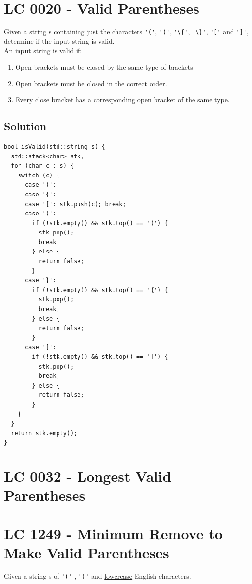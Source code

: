\section{LC 0020 - Valid Parentheses}
Given a string s containing just the characters {\colorbox{CodeBackground}{\lstinline|'('|}}, {\colorbox{CodeBackground}{\lstinline|')'|}}, {\colorbox{CodeBackground}{\lstinline|'\{'|}}, {\colorbox{CodeBackground}{\lstinline|'\}'|}}, {\colorbox{CodeBackground}{\lstinline|'['|}} and {\colorbox{CodeBackground}{\lstinline|']'|}}, determine if the input string is valid.\\

An input string is valid if:
\begin{enumerate}
	\item Open brackets must be closed by the same type of brackets.
	\item Open brackets must be closed in the correct order.
	\item Every close bracket has a corresponding open bracket of the same type.
\end{enumerate}

\subsection*{Solution}
\begin{lstlisting}
bool isValid(std::string s) {
  std::stack<char> stk;
  for (char c : s) {
    switch (c) {
      case '(':
      case '{':
      case '[': stk.push(c); break;
      case ')':
        if (!stk.empty() && stk.top() == '(') {
          stk.pop();
          break;
        } else {
          return false;
        }
      case '}':
        if (!stk.empty() && stk.top() == '{') {
          stk.pop();
          break;
        } else {
          return false;
        }
      case ']':
        if (!stk.empty() && stk.top() == '[') {
          stk.pop();
          break;
        } else {
          return false;
        }
    }
  }
  return stk.empty();
}
\end{lstlisting}

\section{LC 0032 - Longest Valid Parentheses}

\section{LC 1249 - Minimum Remove to Make Valid Parentheses}
Given a string s of {\colorbox{CodeBackground}{\lstinline|'('|}} , {\colorbox{CodeBackground}{\lstinline|')'|}} and \ul{lowercase} English characters.\\

